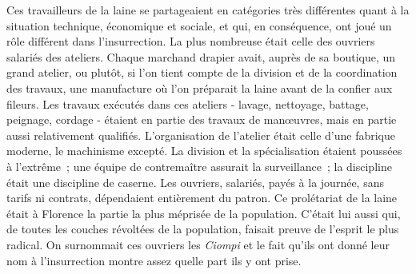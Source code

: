 \documentclass[french,twoside]{book} %
\begin{document}
Ces travailleurs de la laine se partageaient en catégories très différentes quant à la situation technique, économique et sociale, et qui, en conséquence, ont joué un rôle différent dans l'insurrection. La plus nombreuse était celle des ouvriers salariés des ateliers. Chaque marchand drapier avait, auprès de sa boutique, un grand atelier, ou plutôt, si l'on tient compte de la division et de la coordination des travaux, une manufacture où l'on préparait la laine avant de la confier aux fileurs. Les travaux exécutés dans ces ateliers - lavage, nettoya­ge, battage, peignage, cordage - étaient en partie des travaux de manœuvres, mais en partie aussi relativement qualifiés. L'organisation de l'atelier était celle d'une fabrique moderne, le machinisme excepté. La division et la spécia­lisation étaient poussées à l'extrême ; une équipe de contremaître assurait la surveillance ; la discipline était une discipline de caserne. Les ouvriers, sala­riés, payés à la journée, sans tarifs ni contrats, dépendaient entièrement du patron. Ce prolétariat de la laine était à Florence la partie la plus méprisée de la population. C'était lui aussi qui, de toutes les couches révoltées de la popu­lation, faisait preuve de l'esprit le plus radical. On surnommait ces ouvriers les {\itshape Ciompi} et le fait qu'ils ont donné leur nom à l'insurrection montre assez quelle part ils y ont prise.\par
\end{document}
